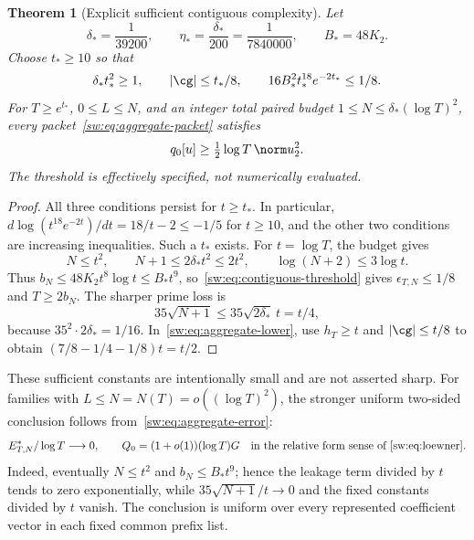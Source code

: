 \documentclass[11pt,a4paper]{article}
\numberwithin{equation}{section}
\newtheorem{theorem}{Theorem}[section]
\theoremstyle{definition}\newtheorem{definition}[theorem]{Definition}
\theoremstyle{remark}\newtheorem{remark}[theorem]{Remark}
\begin{document}
\begin{theorem}[Explicit sufficient contiguous complexity]\label{sw:thm:contiguous}
Let
\begin{equation}\label{sw:eq:delta-eta}
 \delta_* =\frac1{39200},\qquad
 \eta_* =\frac{\delta_*}{200}=\frac1{7840000},\qquad B_*=48K_2.
\end{equation}
Choose $t_*\ge10$ so that
\begin{equation}\label{sw:eq:contiguous-threshold}
 \delta_*t_*^2\ge1,\qquad
 |\cg|\le t_*/8,\qquad
 16B_*^2t_*^{18}e^{-2t_*}\le1/8.
\end{equation}
For $T\ge e^{t_*}$, $0\le L\le N$, and an integer total paired budget
$1\le N\le\delta_*(\log T)^2$, every packet~\eqref{sw:eq:aggregate-packet} satisfies
\begin{equation}\label{sw:eq:contiguous-positive}
 q_0[u]\ge\tfrac12\log T\,\norm u_2^2.
\end{equation}
The threshold is effectively specified, not numerically evaluated.
\end{theorem}
\begin{proof}
All three conditions persist for $t\ge t_*$. In particular,
$d\log(t^{18}e^{-2t})/dt=18/t-2\le-1/5$ for $t\ge10$, and the other two conditions are increasing inequalities. Such a $t_*$ exists.
For $t=\log T$, the budget gives
\[
 N\le t^2,\qquad N+1\le2\delta_*t^2\le2t^2,\qquad
 \log(N+2)\le3\log t.
\]
Thus $b_N\le48K_2t^8\log t\le B_*t^9$, so~\eqref{sw:eq:contiguous-threshold} gives $\epsilon_{T,N}\le1/8$ and $T\ge2b_N$. The sharper prime loss is
\[
 35\sqrt{N+1}\le35\sqrt{2\delta_*}\,t=t/4,
\]
because $35^2\cdot2\delta_*=1/16$. In~\eqref{sw:eq:aggregate-lower}, use $h_T\ge t$ and $|\cg|\le t/8$ to obtain
$(7/8-1/4-1/8)t=t/2$.
\end{proof}
These sufficient constants are intentionally small and are not asserted sharp. For families with $L\le N=N(T)=o((\log T)^2)$, the stronger uniform two-sided conclusion follows from~\eqref{sw:eq:aggregate-error}:
\begin{equation}\label{sw:eq:aggregate-asymptotic}
 E^*_{T,N}/\log T\longrightarrow0,\qquad
 Q_0=(1+o(1))(\log T)G
 \quad\text{in the relative form sense of~\eqref{sw:eq:loewner}}.
\end{equation}
Indeed, eventually $N\le t^2$ and $b_N\le B_*t^9$; hence the leakage term divided by $t$ tends to zero exponentially, while $35\sqrt{N+1}/t\to0$ and the fixed constants divided by $t$ vanish. The conclusion is uniform over every represented coefficient vector in each fixed common prefix list.
\end{document}
